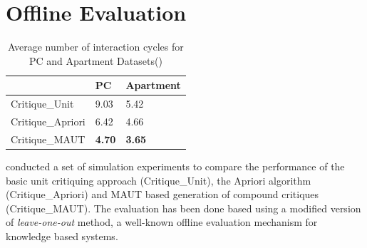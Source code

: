 \section{Offline Evaluation}
\label{sec:offline}

\begin{table}
\caption{Average number of interaction cycles for PC and Apartment Datasets(\cite{mautPaper})}
\centering
\renewcommand{\arraystretch}{1.2}
\label{tab:paperResults}

\begin{tabular}{|p{5cm}|p{3cm}|p{3cm}|}
\hline
& PC & Apartment \\
\hline
Critique\_Unit & 9.03 & 5.42 \\
\hline
Critique\_Apriori & 6.42  & 4.66\\
\hline
Critique\_MAUT & \textbf{4.70} & \textbf{3.65}\\
\hline

\end{tabular}
\end{table}


\cite{mautPaper} conducted a set of simulation experiments to compare the performance of the basic unit critiquing approach (Critique\_Unit), the Apriori algorithm (Critique\_Apriori) and MAUT based generation of compound critiques (Critique\_MAUT).
The evaluation has been done based using a modified version of \textit{leave-one-out} method, a well-known offline evaluation mechanism for knowledge based systems.

